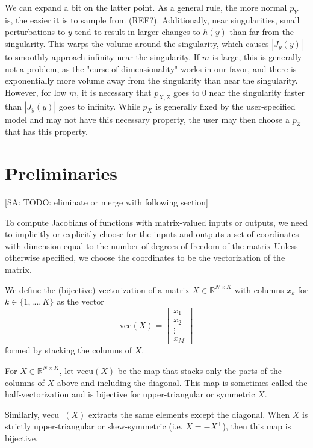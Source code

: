 \documentclass[11pt]{article}
\newcommand{\vect}{\mathrm{vec}}
\newcommand{\vectu}{\mathrm{vecu}}
\begin{document}
We can expand a bit on the latter point.
As a general rule, the more normal $p_Y$ is, the easier it is to sample from (REF?).
Additionally, near singularities, small perturbations to $y$ tend to result in larger changes to $h(y)$ than far from the singularity.
This warps the volume around the singularity, which causes $|J_y(y)|$ to smoothly approach infinity near the singularity.
If $m$ is large, this is generally not a problem, as the "curse of dimensionality" works in our favor, and there is exponentially more volume away from the singularity than near the singularity.
However, for low $m$, it is necessary that $p_{X,Z}$ goes to 0 near the singularity faster than $|J_y(y)|$ goes to infinity.
While $p_X$ is generally fixed by the user-specified model and may not have this necessary property, the user may then choose a $p_Z$ that has this property.

\section{Preliminaries}

[SA: TODO: eliminate or merge with following section]

To compute Jacobians of functions with matrix-valued inputs or outputs, we need to implicitly or explicitly choose for the inputs and outputs a set of coordinates with dimension equal to the number of degrees of freedom of the matrix
Unless otherwise specified, we choose the coordinates to be the vectorization of the matrix.

We define the (bijective) vectorization of a matrix $X \in \mathbb{R}^{N \times K}$ with columns $x_k$ for $k \in \{1, ..., K\}$ as the vector
\[\vect(X) = \begin{bmatrix}x_1 \\ x_2 \\ \vdots \\ x_M\end{bmatrix}\]
formed by stacking the columns of $X$.

For $X \in \mathbb{R}^{N \times K}$, let $\vectu(X)$ be the map that stacks only the parts of the columns of $X$ above and including the diagonal.
This map is sometimes called the half-vectorization and is bijective for upper-triangular or symmetric $X$.

Similarly, $\vectu_-(X)$ extracts the same elements except the diagonal.
When $X$ is strictly upper-triangular or skew-symmetric (i.e. $X = -X^\top$), then this map is bijective.
\end{document}
